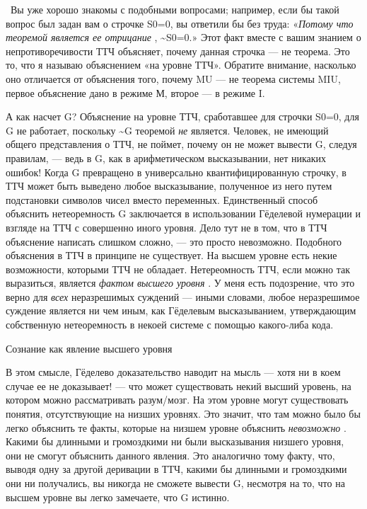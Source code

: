 \documentclass[../main.tex]{subfiles}
\begin{document}
~Вы уже хорошо знакомы с подобными вопросами; например, если бы такой вопрос был задан вам о строчке S0=0, вы ответили бы без труда: «\emph{Потому что теоремой является ее отрицание} , \textasciitilde S0=0.» Этот факт вместе с вашим знанием о непротиворечивости ТТЧ объясняет, почему данная строчка --- не теорема. Это то, что я называю объяснением «на уровне ТТЧ». Обратите внимание, насколько оно отличается от объяснения того, почему MU --- не теорема системы MIU, первое объяснение дано в режиме М, второе --- в режиме I.

А как насчет G? Объяснение на уровне ТТЧ, сработавшее для строчки S0=0, для G не работает, поскольку \textasciitilde G теоремой \emph{не} является. Человек, не имеющий общего представления о ТТЧ, не поймет, почему он не может вывести G, следуя правилам, --- ведь в G, как в арифметическом высказывании, нет никаких ошибок! Когда G превращено в универсально квантифицированную строчку, в ТТЧ может быть выведено любое высказывание, полученное из него путем подстановки символов чисел вместо переменных. Единственный способ объяснить нетеоремность G заключается в использовании Гёделевой нумерации и взгляде на ТТЧ с совершенно иного уровня. Дело тут не в том, что в ТТЧ объяснение написать слишком сложно, --- это просто невозможно. Подобного объяснения в ТТЧ в принципе не существует. На высшем уровне есть некие возможности, которыми ТТЧ не обладает. Нетереомность ТТЧ, если можно так выразиться, является \emph{фактом высшего уровня} . У меня есть подозрение, что это верно для \emph{всех} неразрешимых суждений --- иными словами, любое неразрешимое суждение является ни чем иным, как Гёделевым высказыванием, утверждающим собственную нетеоремность в некоей системе с помощью какого-либа кода.

Сознание как явление высшего уровня

В этом смысле, Гёделево доказательство наводит на мысль --- хотя ни в коем случае ее не доказывает! --- что может существовать некий высший уровень, на котором можно рассматривать разум/мозг. На этом уровне могут существовать понятия, отсутствующие на низших уровнях. Это значит, что там можно было бы легко объяснить те факты, которые на низшем уровне объяснить \emph{невозможно} . Какими бы длинными и громоздкими ни были высказывания низшего уровня, они не смогут объяснить данного явления. Это аналогично тому факту, что, выводя одну за другой деривации в ТТЧ, какими бы длинными и громоздкими они ни получались, вы никогда не сможете вывести G, несмотря на то, что на высшем уровне вы легко замечаете, что G истинно.
\end{document}
